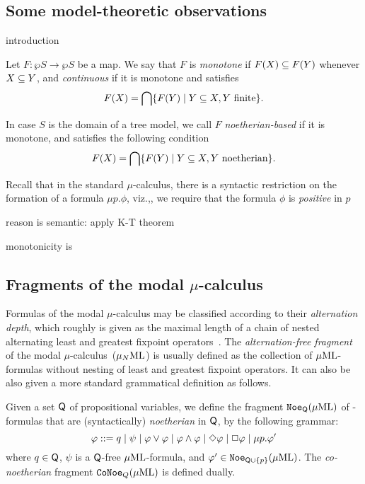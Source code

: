 \subsection{Some model-theoretic observations}

\btbs
\item
introduction
\item
\begin{definition}
Let $F: \wp S \to \wp S$ be a map.
We say that $F$ is \emph{monotone} if $F(X) \subseteq F(Y)$ whenever $X \subseteq Y$, and 
\emph{continuous} if it is monotone and satisfies 
\begin{equation}
F(X) = \bigcap \{ F(Y) \mid Y \sse X, Y \text{ finite} \}.
\end{equation}
\btbs
\item
In case $S$ is the domain of a tree model, we call $F$
\emph{noetherian-based} if it is monotone, and satisfies the following 
condition
\begin{equation}
F(X) = \bigcap \{ F(Y) \mid Y \sse X, Y \text{ noetherian} \}.
\end{equation}
\etbs
\end{definition}
\item
Recall that in the standard $\mu$-calculus, there is a syntactic restriction on
the formation of a formula $\mu p. \phi$, viz.,, we require that the formula 
$\phi$ is \emph{positive} in $p$
\item
reason is semantic: apply K-T theorem
\item
monotonicity is 
\etbs

\subsection{Fragments of the modal $\mu$-calculus}

Formulas of the modal $\mu$-calculus may be classified according to their
\emph{alternation depth}, which roughly is given as the maximal length of
a chain of nested alternating least and greatest fixpoint operators~\cite{Niwinski86}.
The \emph{alternation-free fragment} of the modal $\mu$-calculus~($\mu_{N}\mathrm{ML}$) is 
usually defined as the collection of $\mu\mathrm{ML}$-formulas without nesting of least
and greatest fixpoint operators. 
It can also be also given a more standard grammatical definition as follows.

\begin{definition}
Given a set $\mathsf{Q}$ of propositional variables, we define the fragment 
$\mathtt{Noe}_{\mathsf{Q}}(\mu\mathrm{ML})$ of \muML-formulas that are (syntactically) 
\emph{noetherian} in $\mathsf{Q}$, by the following grammar:
\begin{equation*}
   \varphi \mathrel{::=}  q
   \mid \psi
   \mid \varphi \lor \varphi
   \mid \varphi \land \varphi
     \mid \Diamond \varphi
       \mid \Box \varphi
   \mid \mu p.\varphi'
\end{equation*}
where $q \in \mathsf{Q}$, $\psi$ is a $\mathsf{Q}$-free $\mu\mathrm{ML}$-formula, and 
$\varphi' \in \mathtt{Noe}_{\mathsf{Q}\cup\{p\}}(\mu\mathrm{ML})$. 
The \emph{co-noetherian} fragment $\mathtt{CoNoe}_{Q}(\mu\mathrm{ML})$ is defined dually.
\end{definition}

